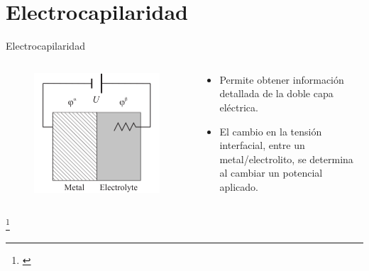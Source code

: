 \documentclass[handout]{beamer}
\newcommand\blfootnote[1]
{%
	\begingroup
	\renewcommand\thefootnote{}\footnote{#1}%
	\addtocounter{footnote}{-1}%
	\endgroup
}
\newcommand{\fcite}[1]{\blfootnote{\cite{#1}}}
\begin{document}
\section{Electrocapilaridad}
\begin{frame}{Electrocapilaridad}
	\begin{columns}
		\begin{column}{0.4\textwidth}
			\begin{figure}[h]
				\centering
				\includegraphics[width=\linewidth]{sources/electrocapillarity}
			\end{figure}
		\end{column}
		\begin{column}{0.6\textwidth}
			\begin{itemize}
				\item Permite obtener informaci\'on detallada de la doble capa el\'ectrica.
				\item El cambio en la tensi\'on interfacial, entre un metal/electrolito, se determina al cambiar un potencial aplicado.
			\end{itemize}
		\end{column}
	\end{columns}
	\fcite{butt2006physics}
\end{frame}
\end{document}
